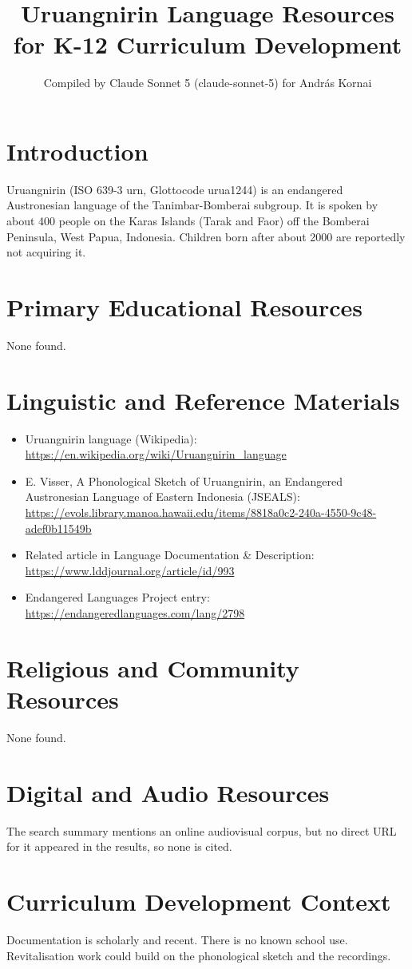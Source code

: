 \documentclass[12pt]{article}
\title{Uruangnirin Language Resources for K-12 Curriculum Development}
\author{Compiled by Claude Sonnet 5 (claude-sonnet-5) for Andr\'as Kornai}
\date{}
\begin{document}
\maketitle
\section{Introduction}
Uruangnirin (ISO 639-3 urn, Glottocode urua1244) is an endangered Austronesian language of the Tanimbar-Bomberai subgroup. It is spoken by about 400 people on the Karas Islands (Tarak and Faor) off the Bomberai Peninsula, West Papua, Indonesia. Children born after about 2000 are reportedly not acquiring it.
\section{Primary Educational Resources}
None found.
\section{Linguistic and Reference Materials}
\begin{itemize}
\item Uruangnirin language (Wikipedia): \url{https://en.wikipedia.org/wiki/Uruangnirin_language}
\item E. Visser, A Phonological Sketch of Uruangnirin, an Endangered Austronesian Language of Eastern Indonesia (JSEALS): \url{https://evols.library.manoa.hawaii.edu/items/8818a0c2-240a-4550-9c48-adef0b11549b}
\item Related article in Language Documentation \& Description: \url{https://www.lddjournal.org/article/id/993}
\item Endangered Languages Project entry: \url{https://endangeredlanguages.com/lang/2798}
\end{itemize}
\section{Religious and Community Resources}
None found.
\section{Digital and Audio Resources}
The search summary mentions an online audiovisual corpus, but no direct URL for it appeared in the results, so none is cited.
\section{Curriculum Development Context}
Documentation is scholarly and recent. There is no known school use. Revitalisation work could build on the phonological sketch and the recordings.
\end{document}
